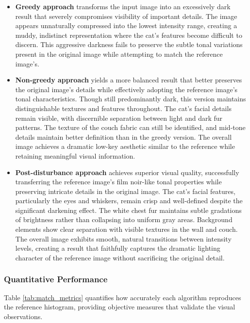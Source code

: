 \documentclass[12pt,a4paper]{article}
\begin{document}
\begin{itemize}
    \item \textbf{Greedy approach} transforms the input image into an excessively dark result that severely compromises visibility of important details. The image appears unnaturally compressed into the lowest intensity range, creating a muddy, indistinct representation where the cat's features become difficult to discern. This aggressive darkness fails to preserve the subtle tonal variations present in the original image while attempting to match the reference image's.

    
    \item \textbf{Non-greedy approach} yields a more balanced result that better preserves the original image's details while effectively adopting the reference image's tonal characteristics. Though still predominantly dark, this version maintains distinguishable textures and features throughout. The cat's facial details remain visible, with discernible separation between light and dark fur patterns. The texture of the couch fabric can still be identified, and mid-tone details maintain better definition than in the greedy version. The overall image achieves a dramatic low-key aesthetic similar to the reference while retaining meaningful visual information.
    
    \item \textbf{Post-disturbance approach} achieves superior visual quality, successfully transferring the reference image's film noir-like tonal properties while preserving intricate details in the original image. The cat's facial features, particularly the eyes and whiskers, remain crisp and well-defined despite the significant darkening effect. The white chest fur maintains subtle gradations of brightness rather than collapsing into uniform gray areas. Background elements show clear separation with visible textures in the wall and couch. The overall image exhibits smooth, natural transitions between intensity levels, creating a result that faithfully captures the dramatic lighting character of the reference image without sacrificing the original detail.
\end{itemize}

\subsubsection{Quantitative Performance}

Table \ref{tab:match_metrics} quantifies how accurately each algorithm reproduces the reference histogram, providing objective measures that validate the visual observations.
\end{document}
